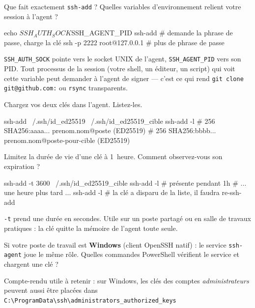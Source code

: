 \documentclass[a4paper,10pt]{exam}
\begin{document}
\begin{questions}
\question Que fait exactement \texttt{ssh-add} ? Quelles variables d'environnement relient
votre session à l'agent ?
\begin{solution}
\begin{bashcode}
echo $SSH_AUTH_SOCK $SSH_AGENT_PID
ssh-add                    # demande la phrase de passe, charge la clé
ssh -p 2222 root@127.0.0.1 # plus de phrase de passe
\end{bashcode}
\texttt{SSH\_AUTH\_SOCK} pointe vers le socket UNIX de l'agent, \texttt{SSH\_AGENT\_PID}
vers son PID. Tout processus de la session (votre shell, un éditeur, un script) qui voit
cette variable peut demander à l'agent de signer — c'est ce qui rend
\texttt{git clone git@github.com:} ou \texttt{rsync} transparents.
\end{solution}
\question Chargez vos deux clés dans l'agent. Listez-les.
\begin{solution}
\begin{bashcode}
ssh-add ~/.ssh/id_ed25519 ~/.ssh/id_ed25519_cible
ssh-add -l
# 256 SHA256:aaaa... prenom.nom@poste (ED25519)
# 256 SHA256:bbbb... prenom.nom@poste-pour-cible (ED25519)
\end{bashcode}
\end{solution}
\question Limitez la durée de vie d'une clé à 1~heure. Comment observez-vous son expiration ?
\begin{solution}
\begin{bashcode}
ssh-add -t 3600 ~/.ssh/id_ed25519_cible
ssh-add -l          # présente pendant 1h
# ... une heure plus tard ...
ssh-add -l          # la clé a disparu de la liste, il faudra re-ssh-add
\end{bashcode}
\texttt{-t} prend une durée en secondes. Utile sur un poste partagé ou en salle de travaux
pratiques : la clé quitte la mémoire de l'agent toute seule.
\end{solution}
\question Si votre poste de travail est \textbf{Windows} (client OpenSSH natif) : le service
\texttt{ssh-agent} joue le même rôle. Quelles commandes PowerShell vérifient le service et
chargent une clé ?
\begin{solution}
Compte-rendu utile à retenir : sur Windows, les clés des comptes \emph{administrateurs}
peuvent aussi être placées dans
\texttt{C:\textbackslash ProgramData\textbackslash ssh\textbackslash administrators\_authorized\_keys}

\end{solution}
\end{questions}
\end{document}

